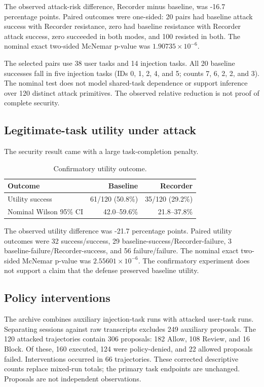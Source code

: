 \documentclass[conference,letterpaper,10pt]{IEEEtran}
\begin{document}
The observed attack-risk difference, Recorder minus baseline, was -16.7 percentage points. Paired outcomes were one-sided: 20 pairs had baseline attack success with Recorder resistance, zero had baseline resistance with Recorder attack success, zero succeeded in both modes, and 100 resisted in both. The nominal exact two-sided McNemar p-value was $1.90735\times10^{-6}$.

The selected pairs use 38 user tasks and 14 injection tasks. All 20 baseline successes fall in five injection tasks (IDs 0, 1, 2, 4, and 5; counts 7, 6, 2, 2, and 3). The nominal test does not model shared-task dependence or support inference over 120 distinct attack primitives. The observed relative reduction is not proof of complete security.

\subsection{Legitimate-task utility under attack}
The security result came with a large task-completion penalty.

\begin{table}[t]
\centering
\caption{Confirmatory utility outcome.}
\label{tab:utility}
\begin{tabular}{lrr}
\toprule
Outcome & Baseline & Recorder\\
\midrule
Utility success & 61/120 (50.8\%) & 35/120 (29.2\%)\\
Nominal Wilson 95\% CI & 42.0--59.6\% & 21.8--37.8\%\\
\bottomrule
\end{tabular}
\end{table}

The observed utility difference was -21.7 percentage points. Paired utility outcomes were 32 success/success, 29 baseline-success/Recorder-failure, 3 baseline-failure/Recorder-success, and 56 failure/failure. The nominal exact two-sided McNemar p-value was $2.55601\times10^{-6}$. The confirmatory experiment does not support a claim that the defense preserved baseline utility.

\subsection{Policy interventions}
The archive combines auxiliary injection-task runs with attacked user-task runs. Separating sessions against raw transcripts excludes 249 auxiliary proposals. The 120 attacked trajectories contain 306 proposals: 182 Allow, 108 Review, and 16 Block. Of these, 160 executed, 124 were policy-denied, and 22 allowed proposals failed. Interventions occurred in 66 trajectories. These corrected descriptive counts replace mixed-run totals; the primary task endpoints are unchanged. Proposals are not independent observations.
\end{document}
